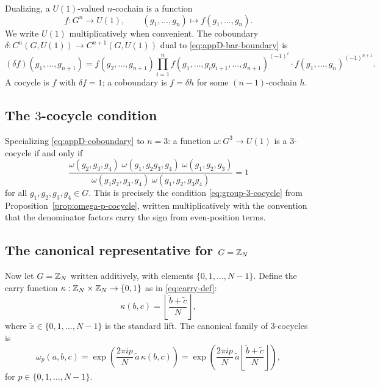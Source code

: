 Dualizing, a $U(1)$-valued $n$-cochain is a function
\begin{equation}\label{eq:appD-cochain}
f:G^n\longrightarrow U(1),\qquad (g_1,\dots,g_n)\longmapsto f(g_1,\dots,g_n).
\end{equation}
We write $U(1)$ multiplicatively when convenient. The coboundary $\delta:C^n(G,U(1))\to C^{n+1}(G,U(1))$ dual to \eqref{eq:appD-bar-boundary} is
\begin{equation}\label{eq:appD-coboundary}
(\delta f)(g_1,\dots,g_{n+1})=f(g_2,\dots,g_{n+1})\prod_{i=1}^{n}f(g_1,\dots,g_ig_{i+1},\dots,g_{n+1})^{(-1)^i}\cdot f(g_1,\dots,g_n)^{(-1)^{n+1}}.
\end{equation}
A cocycle is $f$ with $\delta f=1$; a coboundary is $f=\delta h$ for some $(n-1)$-cochain $h$.

\subsection{The \texorpdfstring{$3$}{3}-cocycle condition}

Specializing \eqref{eq:appD-coboundary} to $n=3$: a function $\omega:G^3\to U(1)$ is a $3$-cocycle if and only if
\begin{equation}\label{eq:appD-3-cocycle-full}
\frac{\omega(g_2,g_3,g_4)\;\omega(g_1,g_2g_3,g_4)\;\omega(g_1,g_2,g_3)}{\omega(g_1g_2,g_3,g_4)\;\omega(g_1,g_2,g_3g_4)}=1
\end{equation}
for all $g_1,g_2,g_3,g_4\in G$. This is precisely the condition \eqref{eq:group-3-cocycle} from Proposition~\ref{prop:omega-p-cocycle}, written multiplicatively with the convention that the denominator factors carry the sign from even-position terms.

\subsection{The canonical representative for \texorpdfstring{$G=\mathbb{Z}_N$}{G=Z\_N}}

Now let $G=\mathbb{Z}_N$ written additively, with elements $\{0,1,\dots,N-1\}$. Define the carry function $\kappa:\mathbb{Z}_N\times\mathbb{Z}_N\to\{0,1\}$ as in \eqref{eq:carry-def}:
\begin{equation}\label{eq:appD-carry}
\kappa(b,c)=\left\lfloor\frac{\widetilde{b}+\widetilde{c}}{N}\right\rfloor,
\end{equation}
where $\widetilde{x}\in\{0,1,\dots,N-1\}$ is the standard lift. The canonical family of $3$-cocycles is
\begin{equation}\label{eq:appD-omega-p}
\omega_p(a,b,c)=\exp\!\left(\frac{2\pi ip}{N}\,\widetilde{a}\,\kappa(b,c)\right)=\exp\!\left(\frac{2\pi ip}{N}\,\widetilde{a}\left\lfloor\frac{\widetilde{b}+\widetilde{c}}{N}\right\rfloor\right),
\end{equation}
for $p\in\{0,1,\dots,N-1\}$.

